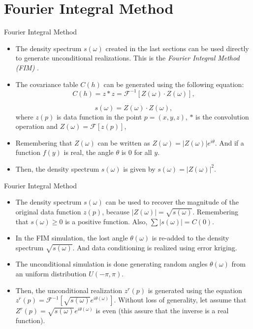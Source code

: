 \section{Fourier Integral Method}
\begin{frame}{Fourier Integral Method}
  \begin{itemize}
  	\item The density spectrum $s(\omega)$ created in the last sections can be used directly to generate unconditional realizations. This is the \textit{Fourier Integral Method (FIM)} \cite{pardo1993fourier}.
    \item The covariance table $C(h)$ can be generated using the following equation:
    $$
    C(h) = z * z = \mathscr{F}^{-1}[Z(\omega) \cdot Z(\omega)],
    $$
    
    $$
    s(\omega) = Z(\omega) \cdot Z(\omega),
    $$
    where $z(p)$ is data function in the point $p=(x,y,z)$, $*$ is the convolution operation and $Z(\omega) = \mathscr{F}[z(p)]$,
    \item Remembering that $Z(\omega)$ can be written as $Z(\omega)=|Z(\omega)|e^{i\theta}$. And if a function $f(y)$ is real, the angle $\theta$ is 0 for all $y$. 
    \item Then, the density spectrum $s(\omega)$ is given by $s(\omega) = |Z(\omega)|^2$.
  \end{itemize}
\end{frame}

\begin{frame}{Fourier Integral Method}
  \begin{itemize}
  	\item The density spectrum $s(\omega)$ can be used  to recover the magnitude of the original data function $z(p)$, because $|Z(\omega)| = \sqrt{s(\omega)}$. Remembering that $s(\omega) \geq 0$ is a positive function. Also, $\sum |s(\omega)| = C(0)$.
    \item In the FIM simulation, the lost angle $\theta(\omega)$ is re-added to the density spectrum  $\sqrt{s(\omega)}$. And data conditioning is realized using error kriging.
    \item The unconditional simulation is done generating random angles $\theta(\omega)$ from an uniform distribution $U(-\pi,\pi)$.
    \item Then, the unconditional realization $z^{r}(p)$ is generated using the equation $z^{r}(p) = \mathscr{F}^{-1}[\sqrt{s(\omega)}e^{i\theta(\omega)}]$. Without loss of generality, let assume that $Z^{r}(p)=\sqrt{s(\omega)}e^{i\theta(\omega)}$ is even (this assure that the inverse is a real function).
  \end{itemize}
\end{frame}

